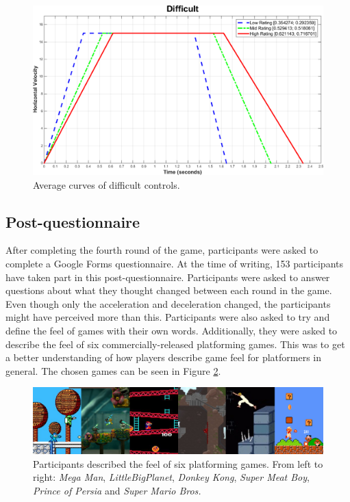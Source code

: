 \begin{figure}[htbp]
\centering
\includegraphics[width=0.9\columnwidth]{Pics/Curves/Difficult_Curve}
\caption{Average curves of difficult controls.}
\label{fig:curve_difficult}
\end{figure}

\subsection{Post-questionnaire}
After completing the fourth round of the game, participants were asked to complete a Google Forms questionnaire. At the time of writing, 153 participants have taken part in this post-questionnaire. Participants were asked to answer questions about what they thought changed between each round in the game. Even though only the acceleration and deceleration changed, the participants might have perceived more than this. Participants were also asked to try and define the feel of games with their own words. Additionally, they were asked to describe the feel of six commercially-released platforming games. This was to get a better understanding of how players describe game feel for platformers in general. The chosen games can be seen in Figure \ref{fig:rate_games_all}.

\begin{figure}[htbp]
\centering
\includegraphics[width=1\textwidth]{Pics/rate_games_all}
\caption{Participants described the feel of six platforming games. From left to right: \textit{Mega Man}, \textit{LittleBigPlanet}, \textit{Donkey Kong}, \textit{Super Meat Boy}, \textit{Prince of Persia} and \textit{Super Mario Bros.}}
\label{fig:rate_games_all}
\end{figure}

